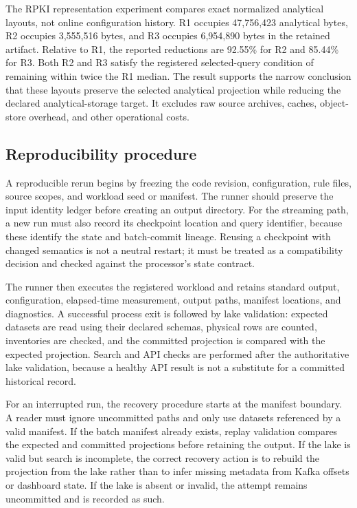 \documentclass[a4paper,11pt]{article}
\begin{document}
The RPKI representation experiment compares exact normalized analytical layouts, not online configuration history. R1 occupies 47,756,423 analytical bytes, R2 occupies 3,555,516 bytes, and R3 occupies 6,954,890 bytes in the retained artifact. Relative to R1, the reported reductions are 92.55\% for R2 and 85.44\% for R3. Both R2 and R3 satisfy the registered selected-query condition of remaining within twice the R1 median. The result supports the narrow conclusion that these layouts preserve the selected analytical projection while reducing the declared analytical-storage target. It excludes raw source archives, caches, object-store overhead, and other operational costs.

\subsection{Reproducibility procedure}

A reproducible rerun begins by freezing the code revision, configuration, rule files, source scopes, and workload seed or manifest. The runner should preserve the input identity ledger before creating an output directory. For the streaming path, a new run must also record its checkpoint location and query identifier, because these identify the state and batch-commit lineage. Reusing a checkpoint with changed semantics is not a neutral restart; it must be treated as a compatibility decision and checked against the processor's state contract.

The runner then executes the registered workload and retains standard output, configuration, elapsed-time measurement, output paths, manifest locations, and diagnostics. A successful process exit is followed by lake validation: expected datasets are read using their declared schemas, physical rows are counted, inventories are checked, and the committed projection is compared with the expected projection. Search and API checks are performed after the authoritative lake validation, because a healthy API result is not a substitute for a committed historical record.

For an interrupted run, the recovery procedure starts at the manifest boundary. A reader must ignore uncommitted paths and only use datasets referenced by a valid manifest. If the batch manifest already exists, replay validation compares the expected and committed projections before retaining the output. If the lake is valid but search is incomplete, the correct recovery action is to rebuild the projection from the lake rather than to infer missing metadata from Kafka offsets or dashboard state. If the lake is absent or invalid, the attempt remains uncommitted and is recorded as such.
\end{document}
